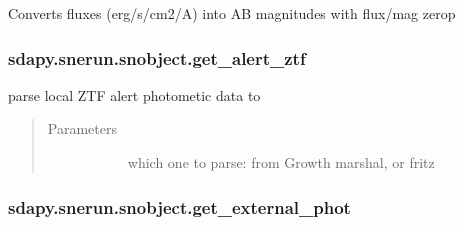 \documentclass[letterpaper,10pt,english]{sphinxmanual}
\begin{document}
\begin{fulllineitems}
\begin{fulllineitems}
\label{\detokenize{generated/sdapy.snerun.snobject.flux_to_mag:sdapy.snerun.snobject.flux_to_mag}}
Converts fluxes (erg/s/cm2/A) into AB magnitudes with flux/mag zerop

\end{fulllineitems}



\subsubsection{sdapy.snerun.snobject.get\_alert\_ztf}
\label{\detokenize{generated/sdapy.snerun.snobject.get_alert_ztf:sdapy-snerun-snobject-get-alert-ztf}}\label{\detokenize{generated/sdapy.snerun.snobject.get_alert_ztf::doc}}

\begin{fulllineitems}
\label{\detokenize{generated/sdapy.snerun.snobject.get_alert_ztf:sdapy.snerun.snobject.get_alert_ztf}}
parse local ZTF alert photometic data to 
\begin{quote}\begin{description}
\item[{Parameters}] \leavevmode\begin{description}
\item[{}] \leavevmode{[}\sphinxtitleref{str}{]}
which one to parse: from Growth marshal, or fritz

\end{description}

\end{description}\end{quote}

\end{fulllineitems}



\subsubsection{sdapy.snerun.snobject.get\_external\_phot}
\label{\detokenize{generated/sdapy.snerun.snobject.get_external_phot:sdapy-snerun-snobject-get-external-phot}}\label{\detokenize{generated/sdapy.snerun.snobject.get_external_phot::doc}}


\end{fulllineitems}
\end{document}
